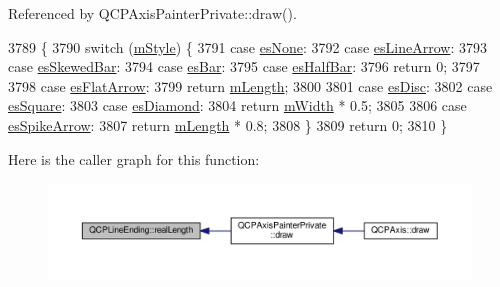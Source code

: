 Referenced by Q\+C\+P\+Axis\+Painter\+Private\+::draw().


\begin{DoxyCode}
3789                                        \{
3790   \textcolor{keywordflow}{switch} (\hyperlink{class_q_c_p_line_ending_a4696fc9117b60f1ca7690fcd2ba56611}{mStyle}) \{
3791   \textcolor{keywordflow}{case} \hyperlink{class_q_c_p_line_ending_a5ef16e6876b4b74959c7261d8d4c2cd5aca12d500f50cd6871766801bac30fb03}{esNone}:
3792   \textcolor{keywordflow}{case} \hyperlink{class_q_c_p_line_ending_a5ef16e6876b4b74959c7261d8d4c2cd5a61f78ee8f375fb21cb9d250687bbcbd2}{esLineArrow}:
3793   \textcolor{keywordflow}{case} \hyperlink{class_q_c_p_line_ending_a5ef16e6876b4b74959c7261d8d4c2cd5a2b2cc96e757ca9bcd91fb70221ed43ab}{esSkewedBar}:
3794   \textcolor{keywordflow}{case} \hyperlink{class_q_c_p_line_ending_a5ef16e6876b4b74959c7261d8d4c2cd5a2cf543bbca332df26d89bf779f50469f}{esBar}:
3795   \textcolor{keywordflow}{case} \hyperlink{class_q_c_p_line_ending_a5ef16e6876b4b74959c7261d8d4c2cd5a126c390f0c359fcd8df1fc5e38d26d5b}{esHalfBar}:
3796     \textcolor{keywordflow}{return} 0;
3797 
3798   \textcolor{keywordflow}{case} \hyperlink{class_q_c_p_line_ending_a5ef16e6876b4b74959c7261d8d4c2cd5a3d7dcea2f100671727c3417142154f8f}{esFlatArrow}:
3799     \textcolor{keywordflow}{return} \hyperlink{class_q_c_p_line_ending_ae8e1e2566b96c05736cd92662dba8af8}{mLength};
3800 
3801   \textcolor{keywordflow}{case} \hyperlink{class_q_c_p_line_ending_a5ef16e6876b4b74959c7261d8d4c2cd5ae5a3414916817258bcc6dddd605e8f5c}{esDisc}:
3802   \textcolor{keywordflow}{case} \hyperlink{class_q_c_p_line_ending_a5ef16e6876b4b74959c7261d8d4c2cd5ae1836502fa43d8990bb62b2d493a140a}{esSquare}:
3803   \textcolor{keywordflow}{case} \hyperlink{class_q_c_p_line_ending_a5ef16e6876b4b74959c7261d8d4c2cd5a378fe5a8b768411b0bc1765210fe7200}{esDiamond}:
3804     \textcolor{keywordflow}{return} \hyperlink{class_q_c_p_line_ending_aca89d21341133c20dc6825c33a5eac48}{mWidth} * 0.5;
3805 
3806   \textcolor{keywordflow}{case} \hyperlink{class_q_c_p_line_ending_a5ef16e6876b4b74959c7261d8d4c2cd5ab9964d0d03f812d1e79de15edbeb2cbf}{esSpikeArrow}:
3807     \textcolor{keywordflow}{return} \hyperlink{class_q_c_p_line_ending_ae8e1e2566b96c05736cd92662dba8af8}{mLength} * 0.8;
3808   \}
3809   \textcolor{keywordflow}{return} 0;
3810 \}
\end{DoxyCode}


Here is the caller graph for this function\+:\nopagebreak
\begin{figure}[H]
\begin{center}
\leavevmode
\includegraphics[width=350pt]{class_q_c_p_line_ending_a6a528e6dc5aabe1077a573b045715f03_icgraph}
\end{center}
\end{figure}


